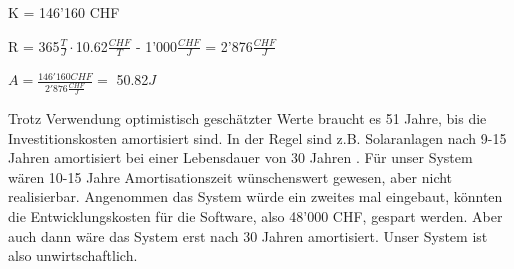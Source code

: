 \bigskip
K = 146'160 CHF

\bigskip
R = 365$\tfrac{T}{J}\cdot$10.62$\tfrac{CHF}{T}$ - 1'000$\tfrac{CHF}{J}$ = 2'876$\tfrac{CHF}{J}$

\bigskip
$A = \tfrac{146'160CHF}{2'876 \tfrac{CHF}{J}} =$ 50.82$J$

Trotz Verwendung optimistisch geschätzter Werte braucht es 51 Jahre, bis die Investitionskosten amortisiert sind. In der Regel sind z.B. Solaranlagen nach 9-15 Jahren amortisiert bei einer Lebensdauer von 30 Jahren \cite{helion}. Für unser System wären 10-15 Jahre Amortisationszeit wünschenswert gewesen, aber nicht realisierbar.
Angenommen das System würde ein zweites mal eingebaut, könnten die Entwicklungskosten für die Software, also 48'000 CHF, gespart werden. Aber auch dann wäre das System erst nach 30 Jahren amortisiert. Unser System ist also unwirtschaftlich.